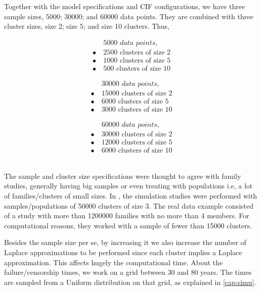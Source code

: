 Together with the model specifications and CIF configurations, we have
three sample sizes, 5000; 30000; and 60000 data points. They are
combined with three cluster sizes, size 2; size 5; and size 10
clusters. Thus,
\begin{minipage}{\textwidth/3}
 \begin{align*}
          &\textit{5000 data points},\\
  \bullet~&\text{2500 clusters of size 2}\\
  \bullet~&\text{1000 clusters of size 5}\\
  \bullet~&\text{500 clusters of size 10}
 \end{align*}
\end{minipage}%
\begin{minipage}{\textwidth/3}
 \begin{align*}
          &\textit{30000 data points},\\
  \bullet~&\text{15000 clusters of size 2}\\
  \bullet~&\text{6000 clusters of size 5}\\
  \bullet~&\text{3000 clusters of size 10}
 \end{align*}
\end{minipage}%
\begin{minipage}{\textwidth/3}
 \begin{align*}
          &\textit{60000 data points},\\
  \bullet~&\text{30000 clusters of size 2}\\
  \bullet~&\text{12000 clusters of size 5}\\
  \bullet~&\text{6000 clusters of size 10}
 \end{align*}
\end{minipage}\\

The sample and cluster size specifications were thought to agree with
family studies, generally having big samples or even treating with
populations i.e, a lot of families/clusters of small
sizes. In , the simulation studies were performed
with samples/populations of 50000 clusters of size 3. The real data
example consisted of a study with more than 1200000 families with no
more than 4 members. For computational reasons, they worked with a
sample of fewer than 15000 clusters.

Besides the sample size per se, by increasing it we also increase the
number of Laplace approximations to be performed since each cluster
implies a Laplace approximation. This affects hugely the computational
time. About the failure/censorship times, we work on a grid between 30
and 80 years. The times are sampled from a Uniform distribution on that
grid, as explained in \autoref{cap:simu}.

